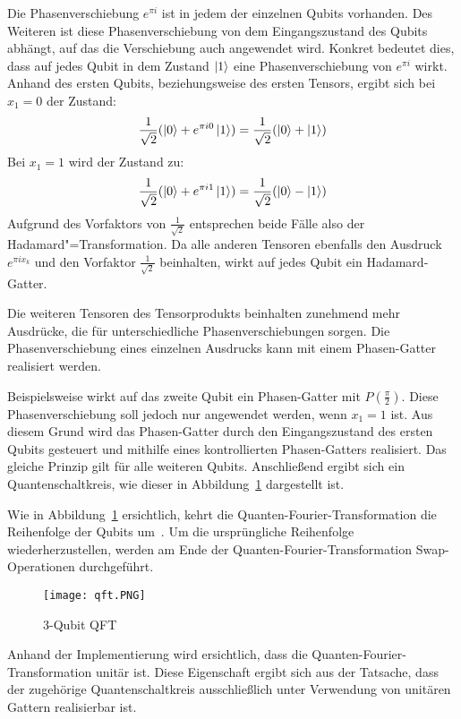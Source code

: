 Die Phasenverschiebung \(e^{\pi i}\) ist in jedem der einzelnen Qubits vorhanden.
Des Weiteren ist diese Phasenverschiebung von dem Eingangszustand des Qubits abhängt,
auf das die Verschiebung auch angewendet wird. 
Konkret bedeutet dies, 
dass auf jedes Qubit in dem Zustand \(\ket{1}\) eine Phasenverschiebung von \(e^{\pi i}\) wirkt.
Anhand des ersten Qubits, 
beziehungsweise des ersten Tensors, 
ergibt sich bei \(x_1 = 0\)
der Zustand: 
\[\frac{1}{\sqrt{2}}(\ket{0} + e^{\pi i 0} \ket{1}) = \frac{1}{\sqrt{2}}(\ket{0} + \ket{1})\]
Bei \(x_1 = 1\) wird der Zustand zu:
\[\frac{1}{\sqrt{2}}(\ket{0} + e^{\pi i 1} \ket{1}) = \frac{1}{\sqrt{2}}(\ket{0} - \ket{1})\]
Aufgrund des Vorfaktors von \(\frac{1}{\sqrt{2}}\) entsprechen beide Fälle also der Hadamard"=Transformation.
Da alle anderen Tensoren ebenfalls den Ausdruck \(e^{\pi i x_k}\) 
und den Vorfaktor \(\frac{1}{\sqrt{2}}\) beinhalten, 
wirkt auf jedes Qubit ein Hadamard-Gatter.

Die weiteren Tensoren des Tensorprodukts beinhalten zunehmend mehr Ausdrücke, 
die für unterschiedliche Phasenverschiebungen sorgen. 
Die Phasenverschiebung eines einzelnen Ausdrucks kann mit einem Phasen-Gatter realisiert werden. 

Beispielsweise wirkt auf das zweite Qubit ein Phasen-Gatter mit \(P(\frac{\pi}{2} )\).
Diese Phasenverschiebung soll jedoch nur angewendet werden, 
wenn \(x_1 = 1\) ist.
Aus diesem Grund wird das Phasen-Gatter durch den Eingangszustand des ersten Qubits gesteuert und 
mithilfe eines kontrollierten Phasen-Gatters realisiert.
Das gleiche Prinzip gilt für alle weiteren Qubits.
Anschließend ergibt sich ein Quantenschaltkreis, 
wie dieser in Abbildung~\ref{fig:qft} dargestellt ist.

Wie in Abbildung~\ref{fig:qft} ersichtlich, 
kehrt die Quanten-Fourier-Transformation die Reihenfolge der Qubits um~\cite[217]{homeister2023quantum215}.
Um die ursprüngliche Reihenfolge wiederherzustellen, 
werden am Ende der Quanten-Fourier-Transformation Swap-Operationen durchgeführt.
\begin{figure}[H]
  \centering
  \texttt{[image: qft.PNG]}
  \caption{3-Qubit QFT}
  \label{fig:qft}
\end{figure}

Anhand der Implementierung wird ersichtlich,
dass die Quanten-Fourier-Transformation unitär ist. 
Diese Eigenschaft ergibt sich aus der Tatsache, 
dass der zugehörige Quantenschaltkreis ausschließlich unter Verwendung von unitären Gattern realisierbar ist.

